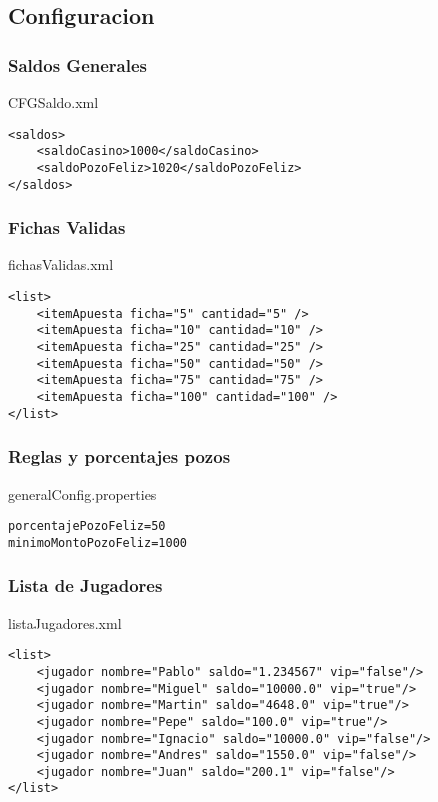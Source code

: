 \subsection{Configuracion}
\label{sec:Configuracion}

\subsubsection{Saldos Generales}
\label{sec:SaldosGenerales}
CFGSaldo.xml
\begin{framed}
\begin{verbatim}
<saldos>
	<saldoCasino>1000</saldoCasino>
	<saldoPozoFeliz>1020</saldoPozoFeliz>
</saldos>
\end{verbatim}
\end{framed}

\subsubsection{Fichas Validas}
\label{sec:FichasValidas}
fichasValidas.xml
\begin{framed}
\begin{verbatim}
<list>
	<itemApuesta ficha="5" cantidad="5" />
	<itemApuesta ficha="10" cantidad="10" />
	<itemApuesta ficha="25" cantidad="25" />
	<itemApuesta ficha="50" cantidad="50" />
	<itemApuesta ficha="75" cantidad="75" />
	<itemApuesta ficha="100" cantidad="100" />
</list>
\end{verbatim}
\end{framed}

\subsubsection{Reglas y porcentajes pozos}
\label{sec:ReglasYPorcentajesPozos}
generalConfig.properties
\begin{framed}
\begin{verbatim}
porcentajePozoFeliz=50
minimoMontoPozoFeliz=1000
\end{verbatim}
\end{framed}

\subsubsection{Lista de Jugadores}
\label{sec:ListaDeJugadores}
listaJugadores.xml
\begin{framed}
\begin{verbatim}
<list>
	<jugador nombre="Pablo" saldo="1.234567" vip="false"/>
	<jugador nombre="Miguel" saldo="10000.0" vip="true"/>
	<jugador nombre="Martin" saldo="4648.0" vip="true"/>
	<jugador nombre="Pepe" saldo="100.0" vip="true"/>
	<jugador nombre="Ignacio" saldo="10000.0" vip="false"/>
	<jugador nombre="Andres" saldo="1550.0" vip="false"/>
	<jugador nombre="Juan" saldo="200.1" vip="false"/>
</list>
\end{verbatim}
\end{framed}

